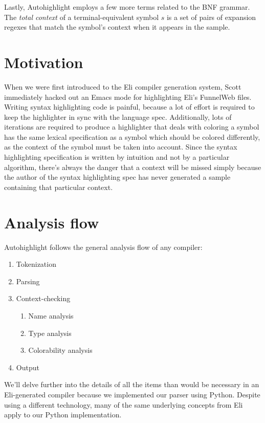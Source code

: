 \documentclass[]{article}
\begin{document}
  Lastly, Autohighlight employs a few more terms related to the BNF
  grammar. The {\em total context} of a terminal-equivalent symbol $s$
  is a set of pairs of expansion regexes that match the symbol's
  context when it appears in the sample.
  
  \section{Motivation}
  When we were first introduced to the Eli compiler generation system,
  Scott immediately hacked out an Emacs mode for highlighting Eli's
  FunnelWeb files. Writing syntax highlighting code is painful,
  because a lot of effort is required to keep the highlighter in sync
  with the language spec. Additionally, lots of iterations are
  required to produce a highlighter that deals with coloring a symbol
  has the same lexical specification as a symbol which should be
  colored differently, as the context of the symbol must be taken into
  account. Since the syntax highlighting specification is written by
  intuition and not by a particular algorithm, there's always the
  danger that a context will be missed simply because the author of
  the syntax highlighting spec has never generated a sample containing
  that particular context.
  
  \section{Analysis flow}
  Autohighlight follows the general analysis flow of any compiler:
  \begin{enumerate}
  \item Tokenization
  \item Parsing
  \item Context-checking
    \begin{enumerate}
    \item Name analysis
    \item Type analysis
    \item Colorability analysis
    \end{enumerate}
  \item Output
  \end{enumerate}

  We'll delve further into the details of all the items than would be
  necessary in an Eli-generated compiler because we implemented our
  parser using Python. Despite using a different technology, many of
  the same underlying concepts from Eli apply to our Python
  implementation.
\end{document}

